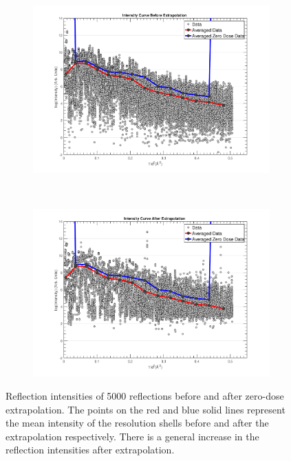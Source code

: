 \begin{figure}
	\centering
	\begin{subfigure}[b]{0.94\textwidth}
		\centering
		\includegraphics[width=\textwidth]{figures/zde/IntensityCurve_BeforeExtrapolation.pdf}
		\caption{}
		\label{fig:Before extrapolation all observations - Extrapolation method}
	\end{subfigure}
	\\
	\begin{subfigure}[b]{0.94\textwidth}
		\centering
		\includegraphics[width=\textwidth]{figures/zde/IntensityCurve_AfterExtrapolation.pdf}
		\caption{}
		\label{fig:After extrapolation all observations - Extrapolation method}
	\end{subfigure}
	\caption{Reflection intensities of 5000 reflections before and after zero-dose extrapolation.
	The points on the red and blue solid lines represent the mean intensity of the resolution shells before and after the extrapolation respectively.
	There is a general increase in the reflection intensities after extrapolation.}
	\label{fig:Before and after extrapolation results - Extrapolation method}
\end{figure}

